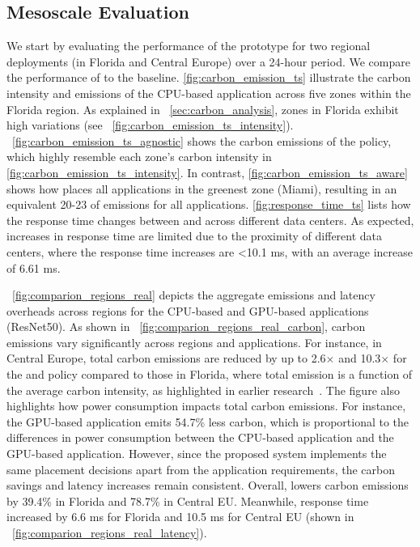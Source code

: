 \subsection{Mesoscale Evaluation}\label{sec:eval_mesoscale}
We start by evaluating the performance of the \proposedsystem prototype for two regional deployments (in Florida and Central Europe) over a 24-hour period. We compare the performance of \proposedsystem to the \latencyaware baseline. \autoref{fig:carbon_emission_ts} illustrate the carbon intensity and emissions of the CPU-based application across five zones within the Florida region. 
As explained in ~\autoref{sec:carbon_analysis}, zones in Florida exhibit high variations (see ~\autoref{fig:carbon_emission_ts_intensity}). ~\autoref{fig:carbon_emission_ts_agnostic} shows the carbon emissions of the \latencyaware policy, which highly resemble each zone's carbon intensity in \autoref{fig:carbon_emission_ts_intensity}. In contrast, \autoref{fig:carbon_emission_ts_aware} shows how \proposedsystem places all applications in the greenest zone (Miami), resulting in an equivalent 20-23 \emissionunit of emissions for all applications.
\autoref{fig:response_time_ts} lists how the response time changes between \latencyaware and \proposedsystem across different data centers. As expected, increases in response time are limited due to the proximity of different data centers, where the response time increases are <10.1 ms, with an average increase of 6.61 ms.  %

~\autoref{fig:comparion_regions_real} depicts the aggregate emissions and latency overheads across regions for the CPU-based and GPU-based applications (ResNet50). As shown in ~\autoref{fig:comparion_regions_real_carbon}, carbon emissions vary significantly across regions and applications. For instance, in Central Europe, total carbon emissions are reduced by up to 2.6$\times$ and 10.3$\times$ for the \latencyaware and \proposedsystem policy compared to those in Florida, where total emission is a function of the average carbon intensity, as highlighted in earlier research~\cite{hanafy2023carbonscaler}.
The figure also highlights how power consumption impacts total carbon emissions. For instance, the GPU-based application emits 54.7\% less carbon, which is proportional to the differences in power consumption between the CPU-based application and the GPU-based application. However, since the proposed system implements the same placement decisions apart from the application requirements, the carbon savings and latency increases remain consistent. Overall, \proposedsystem lowers carbon emissions by 39.4\% in Florida and 78.7\% in Central EU. Meanwhile, response time increased by 6.6 ms for Florida and 10.5 ms for Central EU (shown in ~\autoref{fig:comparion_regions_real_latency}).

